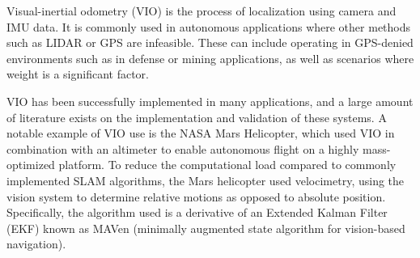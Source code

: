 \documentclass[bare_jrnl_transmag]{subfiles}
\begin{document}
Visual-inertial odometry (VIO) is the process of localization using camera and IMU data. It is commonly used in autonomous applications where other methods such as LIDAR or GPS are infeasible. These can include operating in GPS-denied environments such as in defense or mining applications, as well as scenarios where weight is a significant factor. 



VIO has been successfully implemented in many applications, and a large amount of literature exists on the implementation and validation of these systems. A notable example of VIO use is the NASA Mars Helicopter, which used VIO in combination with an altimeter to enable autonomous flight on a highly mass-optimized platform. To reduce the computational load compared to commonly implemented SLAM algorithms, the Mars helicopter used velocimetry, using the vision system to determine relative motions as opposed to absolute position. Specifically, the algorithm used is a derivative of an Extended Kalman Filter (EKF) known as MAVen (minimally augmented state algorithm for vision-based navigation). 
\end{document}
